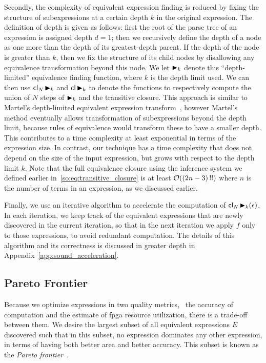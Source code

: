 Secondly, the complexity of equivalent expression finding is reduced by
fixing the structure of subexpressions at a certain depth $k$ in the original
expression.  The definition of depth is given as follows: first the root of
the parse tree of an expression is assigned depth $d = 1$; then we recursively
define the depth of a node as one more than the depth of its greatest-depth
parent.  If the depth of the node is greater than $k$, then we fix the
structure of its child nodes by disallowing any equivalence transformation
beyond this node. We let $\operatorname{\blacktriangleright}_k$ denote this ``depth-limited'' equivalence
finding function, where $k$ is the depth limit used.  We can then use
$\operatorname{\mathsf{cl}}_N \operatorname{\blacktriangleright}_k$ and $\operatorname{\mathsf{cl}} \operatorname{\blacktriangleright}_k$ to denote the functions to
respectively compute the union of $N$ steps of $\operatorname{\blacktriangleright}_k$ and the transitive
closure. This approach is similar to Martel's depth-limited equivalent
expression transform~\cite{martel07}, however Martel's method eventually allows
transformation of subexpressions beyond the depth limit, because rules of
equivalence would transform these to have a smaller depth.  This contributes
to a time complexity at least exponential in terms of the expression size. In
contrast, our technique has a time complexity that does not depend on the size
of the input expression, but grows with respect to the depth limit $k$. Note
that the full equivalence closure using the inference system we defined earlier
in~\eqref{so:eq:transitive_closure} is at least $\operatorname{\mathcal{O}}((2n - 3)\,!!)$ where $n$
is the number of terms in an expression, as we discussed earlier.

Finally, we use an iterative algorithm to accelerate the computation of
$\operatorname{\mathsf{cl}}_N \operatorname{\blacktriangleright}_k (\epsilon)$.  In each iteration, we keep track of the
equivalent expressions that are newly discovered in the current iteration, so
that in the next iteration we apply $f$ only to those expressions, to avoid
redundant computation.  The details of this algorithm and its correctness is
discussed in greater depth in Appendix~\ref{app:sound_acceleration}.


\subsection{Pareto Frontier}
\label{so:sub:pareto}

Because we optimize expressions in two quality metrics, \ie~the accuracy of
computation and the estimate of \gls{fpga} resource utilization, there is
a trade-off between them. We desire the largest subset of all equivalent
expressions $E$ discovered such that in this subset, no expression dominates
any other expression, in terms of having both better area and better
accuracy. This subset is known as the \emph{Pareto frontier}~\cite{legriel10}.

